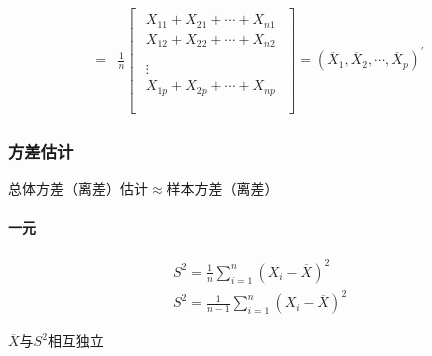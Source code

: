 \documentclass[12pt]{book}
\begin{document}
\begin{align*}
    = & \frac{1}{n} \left[
        \begin{matrix}
            \begin{matrix}
                X_{11}+X_{21}+\cdots+X_{n1} \\
                X_{12}+X_{22}+\cdots+X_{n2} \\
            \end{matrix} \\
            \begin{matrix}
                \vdots                      \\
                X_{1p}+X_{2p}+\cdots+X_{np} \\
            \end{matrix} \\\end{matrix}\right]
    =\left({\overline{X}}_1,{\overline{X}}_2,\cdots,{\overline{X}}_p\right)^\prime
\end{align*}


\subsubsection{方差估计}

总体方差（离差）估计$\approx$样本方差（离差）

\paragraph{一元}

\begin{gather*}
    S^2=\frac{1}{n}\sum_{i=1}^{n}{(X_i-\overline{X})^2}\\
    S^2=\frac{1}{n-1}\sum_{i=1}^{n}{(X_i-\overline{X})^2}
\end{gather*}
\par $\overline{X}$与$S^2$相互独立
\end{document}
